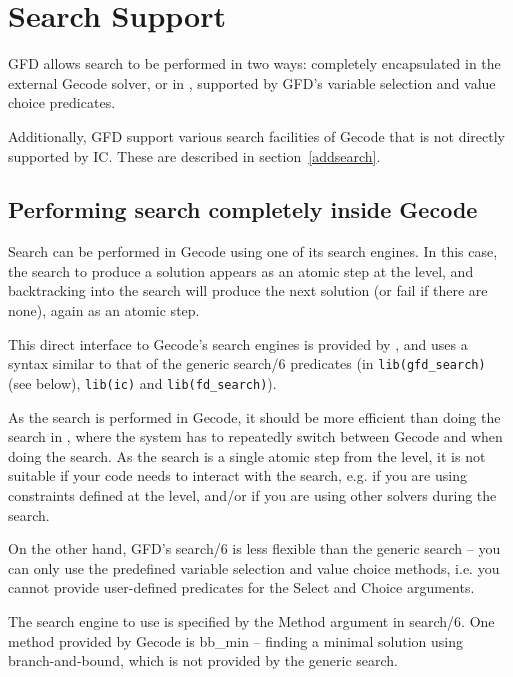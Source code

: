 \section{Search Support}

GFD allows search to be performed in two ways: 
completely encapsulated in the external Gecode solver, or
in {\eclipse}, supported by GFD's variable selection 
and value choice predicates. 

Additionally, GFD support various search facilities of Gecode that is
not directly supported by IC. These are described in section~\ref{addsearch}.

\subsection{Performing search completely inside Gecode}
\label{searcheng}
Search can be performed in Gecode using one of its search engines. 
In this 
case, the search to produce a solution appears as an atomic step at
the {\eclipse} level, and backtracking into the search will produce the next 
solution (or fail if there are none), again as an atomic step.

This direct interface to Gecode's search engines is provided by
,
and uses a syntax similar to that of the generic search/6 predicates
(in {\tt lib(gfd_search)} (see below), {\tt lib(ic)} and {\tt lib(fd_search)}). 

As the search is performed in Gecode, it should be more efficient than doing
the search in \eclipse, where the system has to repeatedly switch between
Gecode and {\eclipse} when doing the search. As the search is a single atomic
step from the {\eclipse} level, it is not suitable if your code needs to
interact with the search, e.g. if you are using constraints defined at the
{\eclipse} level, and/or if you are using other solvers during the search.

On the other hand, GFD's search/6 is less flexible than the generic search
-- you can only use the predefined variable 
selection and value choice methods, i.e. you cannot provide user-defined
predicates for the Select and Choice arguments. 

The search engine to use is specified by the Method argument in search/6. 
One method provided by Gecode is bb_min -- finding a minimal solution using
branch-and-bound, which is not provided by the generic search. 

